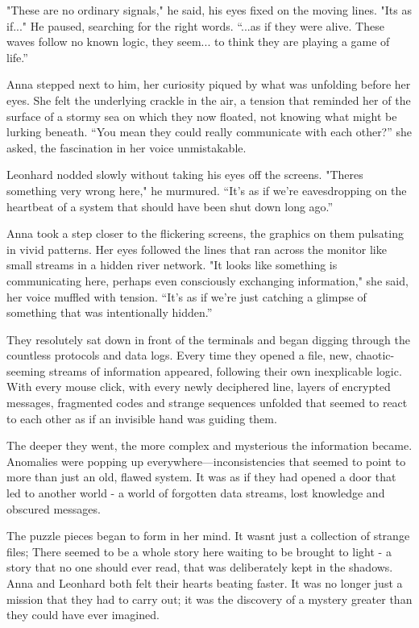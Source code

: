 \documentclass[
]{article}
\begin{document}
"These are no ordinary signals," he said, his eyes fixed on the moving
lines. "It\textquotesingle s as if..." He paused, searching for the
right words. ``...as if they were alive. These waves follow no known
logic, they seem... to think they are playing a game of life.''

Anna stepped next to him, her curiosity piqued by what was unfolding
before her eyes. She felt the underlying crackle in the air, a tension
that reminded her of the surface of a stormy sea on which they now
floated, not knowing what might be lurking beneath. ``You mean they
could really communicate with each other?'' she asked, the fascination
in her voice unmistakable.

Leonhard nodded slowly without taking his eyes off the screens.
"There\textquotesingle s something very wrong here," he murmured. ``It's
as if we're eavesdropping on the heartbeat of a system that should have
been shut down long ago.''

Anna took a step closer to the flickering screens, the graphics on them
pulsating in vivid patterns. Her eyes followed the lines that ran across
the monitor like small streams in a hidden river network. "It looks like
something is communicating here, perhaps even consciously exchanging
information," she said, her voice muffled with tension. ``It's as if
we're just catching a glimpse of something that was intentionally
hidden.''

They resolutely sat down in front of the terminals and began digging
through the countless protocols and data logs. Every time they opened a
file, new, chaotic-seeming streams of information appeared, following
their own inexplicable logic. With every mouse click, with every newly
deciphered line, layers of encrypted messages, fragmented codes and
strange sequences unfolded that seemed to react to each other as if an
invisible hand was guiding them.

The deeper they went, the more complex and mysterious the information
became. Anomalies were popping up everywhere---inconsistencies that
seemed to point to more than just an old, flawed system. It was as if
they had opened a door that led to another world - a world of forgotten
data streams, lost knowledge and obscured messages.

The puzzle pieces began to form in her mind. It wasn\textquotesingle t
just a collection of strange files; There seemed to be a whole story
here waiting to be brought to light - a story that no one should ever
read, that was deliberately kept in the shadows. Anna and Leonhard both
felt their hearts beating faster. It was no longer just a mission that
they had to carry out; it was the discovery of a mystery greater than
they could have ever imagined.
\end{document}
